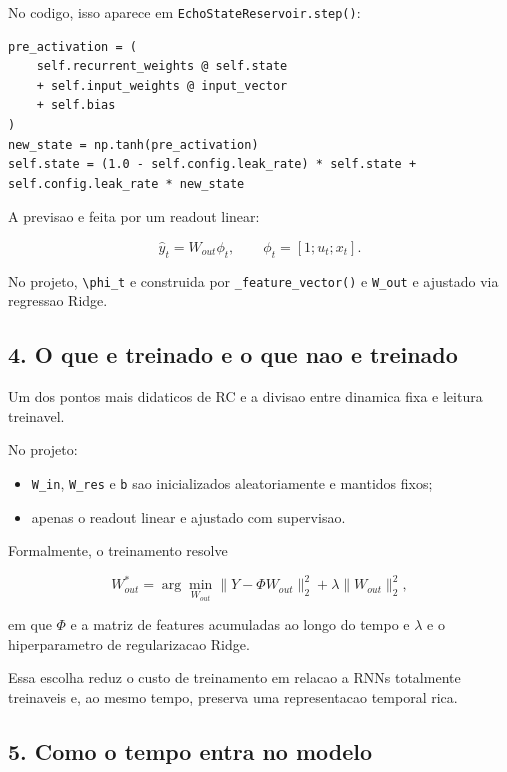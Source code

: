 \documentclass[12pt]{article}
\providecommand{\tightlist}{%
          \setlength{\itemsep}{0pt}\setlength{\parskip}{0pt}}
\begin{document}
No codigo, isso aparece em \texttt{EchoStateReservoir.step()}:

\begin{verbatim}
pre_activation = (
    self.recurrent_weights @ self.state
    + self.input_weights @ input_vector
    + self.bias
)
new_state = np.tanh(pre_activation)
self.state = (1.0 - self.config.leak_rate) * self.state + self.config.leak_rate * new_state
\end{verbatim}

A previsao e feita por um readout linear:

\[
\hat{y}_t = W_{out} \phi_t,
\qquad
\phi_t = [1; u_t; x_t].
\]

No projeto, \texttt{\textbackslash{}phi\_t} e construida por \texttt{\_feature\_vector()} e \texttt{W\_out} e ajustado via regressao Ridge.

\subsection{4. O que e treinado e o que nao e treinado}\label{4-o-que-e-treinado-e-o-que-nao-e-treinado}

Um dos pontos mais didaticos de RC e a divisao entre dinamica fixa e leitura treinavel.

No projeto:

\begin{itemize}
\tightlist
\item
  \texttt{W\_in}, \texttt{W\_res} e \texttt{b} sao inicializados aleatoriamente e mantidos fixos;
\item
  apenas o readout linear e ajustado com supervisao.
\end{itemize}

Formalmente, o treinamento resolve

\[
W_{out}^* = \arg\min_{W_{out}}
\|Y - \Phi W_{out}\|_2^2 + \lambda \|W_{out}\|_2^2,
\]

em que \(\Phi\) e a matriz de features acumuladas ao longo do tempo e \(\lambda\) e o hiperparametro de regularizacao Ridge.

Essa escolha reduz o custo de treinamento em relacao a RNNs totalmente treinaveis e, ao mesmo tempo, preserva uma representacao temporal rica.

\subsection{5. Como o tempo entra no modelo}\label{5-como-o-tempo-entra-no-modelo}
\end{document}
